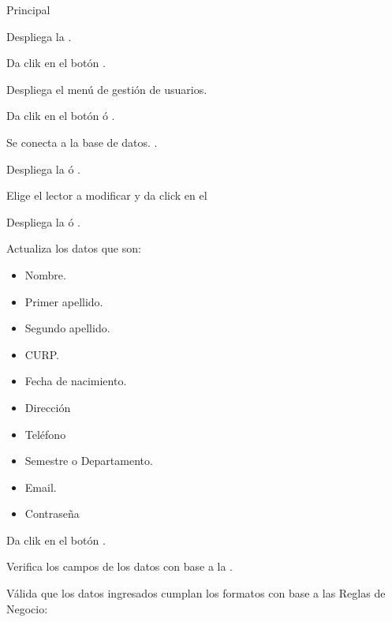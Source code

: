 	
	
	\begin{UCtrayectoria}{Principal}
	
		\UCpaso Despliega la .

		\UCpaso[\UCactor] Da clik en el botón .

		\UCpaso Despliega el menú de gestión de usuarios. 

		\UCpaso[\UCactor] Da clik en el botón  ó .\label{CU4.2ConectarBaseDatos}

		\UCpaso Se conecta a la base de datos. .

		\UCpaso Despliega la  ó .

		\UCpaso[\UCactor] Elige el lector a modificar y da click en el 

		\UCpaso Despliega la  ó .


		\UCpaso[\UCactor] Actualiza los datos que son: 
			\begin{itemize}
				\item Nombre.
				\item Primer apellido.
				\item Segundo apellido.
				\item CURP.
				\item Fecha de nacimiento.
				\item Dirección
				\item Teléfono
				\item Semestre o Departamento.
				\item Email.
				\item Contraseña
			\end{itemize} 
		\label{CU4.1FormularioLector}

		\UCpaso[\UCactor] Da clik en el botón .

		\UCpaso Verifica los campos de los datos con base a la  .

		\UCpaso Válida que los datos ingresados cumplan los formatos con base a las Reglas de Negocio: 
				

\end{UCtrayectoria}
